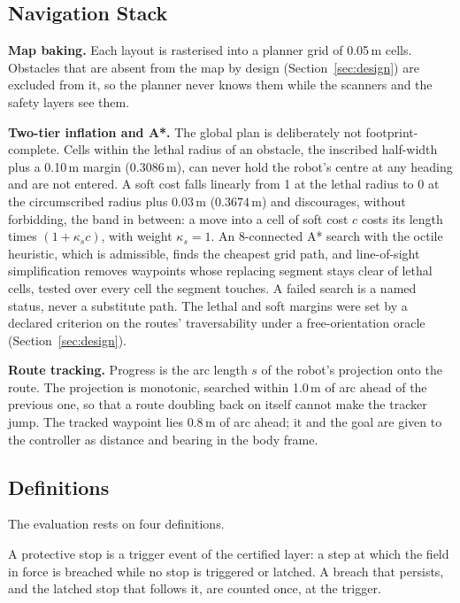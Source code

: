 \documentclass[sensors,article,submit,moreauthors]{Definitions/mdpi}
\begin{document}
\subsection{Navigation Stack}\label{sec:navstack}

\textbf{Map baking.} Each layout is rasterised into a planner grid of 0.05\,m cells. Obstacles that are absent from the map by design (Section~\ref{sec:design}) are excluded from it, so the planner never knows them while the scanners and the safety layers see them.

\textbf{Two-tier inflation and A*.} The global plan is deliberately not footprint-complete. Cells within the lethal radius of an obstacle, the inscribed half-width plus a 0.10\,m margin ($0.3086$\,m), can never hold the robot's centre at any heading and are not entered. A soft cost falls linearly from 1 at the lethal radius to 0 at the circumscribed radius plus 0.03\,m ($0.3674$\,m) and discourages, without forbidding, the band in between: a move into a cell of soft cost $c$ costs its length times $(1 + \kappa_s c)$, with weight $\kappa_s = 1$. An 8-connected A* search with the octile heuristic, which is admissible, finds the cheapest grid path, and line-of-sight simplification removes waypoints whose replacing segment stays clear of lethal cells, tested over every cell the segment touches. A failed search is a named status, never a substitute path. The lethal and soft margins were set by a declared criterion on the routes' traversability under a free-orientation oracle (Section~\ref{sec:design}).

\textbf{Route tracking.} Progress is the arc length $s$ of the robot's projection onto the route. The projection is monotonic, searched within 1.0\,m of arc ahead of the previous one, so that a route doubling back on itself cannot make the tracker jump. The tracked waypoint lies 0.8\,m of arc ahead; it and the goal are given to the controller as distance and bearing in the body frame.

\subsection{Definitions}\label{sec:definitions}

The evaluation rests on four definitions.

\begin{Definition}\label{def:stop}
A protective stop is a trigger event of the certified layer: a step at which the field in force is breached while no stop is triggered or latched. A breach that persists, and the latched stop that follows it, are counted once, at the trigger.
\end{Definition}
\end{document}
